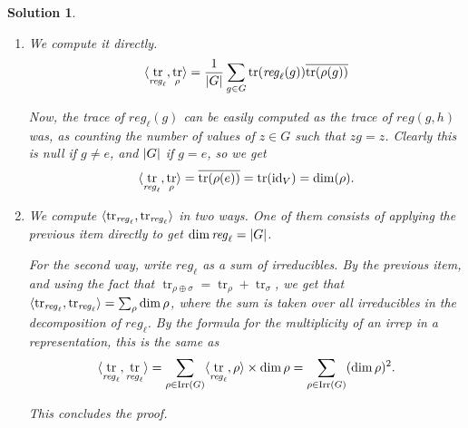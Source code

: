 \documentclass{article}
\theoremstyle{nonumberplain}
\newtheorem{sol}{Solution}
\newcommand{\id}{\mathrm{id}}
\newcommand{\conj}[1]{\overline{#1}}
\newcommand{\reg}{\mathit{reg}}
\newcommand{\regl}{{\mathit{reg}_\ell}}
\DeclareMathOperator{\trace}{tr}
\DeclarePairedDelimiter{\abs}{\lvert}{\rvert}
\DeclarePairedDelimiter{\braket}{\langle}{\rangle}
\begin{document}
\begin{sol}
\leavevmode
\begin{enumerate}
\item We compute it directly.
\begin{equation}
\braket{\trace_\regl, \trace_\rho} = \frac1{\abs{G}} \sum_{g \in G} \trace(\regl(g)) \conj{\trace(\rho(g))}
\end{equation}

Now, the trace of $\regl(g)$ can be easily computed as the trace of $\reg(g,h)$ was, as counting the number of values of $z \in G$ such that $zg = z$. Clearly this is null if $g \neq e$, and $\abs{G}$ if $g = e$, so we get
\begin{equation}
\braket{\trace_\regl, \trace_\rho} = \conj{\trace(\rho(e))} = \trace(\id_V) = \dim(\rho).
\end{equation}

\item We compute $\braket{\trace_\regl, \trace_\regl}$ in two ways. One of them consists of applying the previous item directly to get $\dim \regl = \abs{G}$.

For the second way, write $\regl$ as a sum of irreducibles. By the previous item, and using the fact that $\trace_{\rho \oplus \sigma} = \trace_\rho + \trace_\sigma$, we get that $\braket{\trace_\regl, \trace_\regl} = \sum_{\rho} \dim \rho$, where the sum is taken over all irreducibles in the decomposition of $\regl$. By the formula for the multiplicity of an irrep in a representation, this is the same as
\begin{equation}
\braket{\trace_\regl, \trace_\regl} = \sum_{\rho \in \mathrm{Irr}(G)} \braket{\trace_\regl, \rho} \times \dim \rho = \sum_{\rho \in \mathrm{Irr}(G)} (\dim \rho)^2.
\end{equation}

This concludes the proof.
\end{enumerate}
\end{sol}
\end{document}
